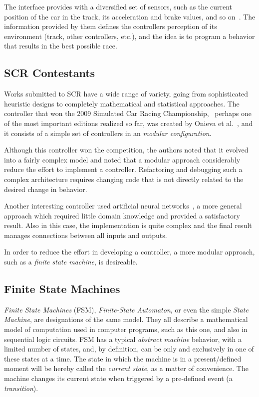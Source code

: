 The interface provides with a diversified set of sensors, such as the current 
position of the car in the track, its acceleration and brake values, and so on~\cite{scr2009}. 
The information provided by them defines the controllers perception of its environment (track, other controllers, etc.), and the idea is to program a behavior that results
in the best possible race. 

\subsection{SCR Contestants}
Works submitted to SCR have a wide range of variety, going from sophisticated 
heuristic designs to completely mathematical and statistical approaches. The 
controller that won the 2009 Simulated Car Racing Championship,~\cite{scr2009}
perhaps one of the most important editions realized so far, was created by 
Onieva et al.~\cite{onieva_2009}, and it 
consists of a simple set of controllers in an \emph{modular configuration}. 

Although this controller won the competition, the authors noted that it evolved 
into a fairly complex model and noted that a modular approach considerably reduce 
the effort to implement a  controller. Refactoring and debugging such a complex 
architecture requires changing code that is not directly related to the desired
change in behavior.

Another interesting controller used  artificial neural networks~\cite{cardamone_2010},
a more general approach which required little domain knowledge and provided a 
satisfactory result. Also in this case,  the implementation is quite complex and 
the final result manages connections between all inputs and outputs.

In order to reduce the effort in developing a controller, a more modular approach,
such as a \emph{finite state machine}, is desireable.

\subsection{Finite State Machines}\label{sec:fsm}

\emph{Finite State Machines} (FSM), \emph{Finite-State Automaton}, or even the 
simple \emph{State Machine}, are designations of the same model. They all 
describe a mathematical model of computation used in computer programs, such as 
this one, and also in sequential logic circuits. FSM has a typical \textit{abstract machine} behavior,
with a limited number of states, and, by definition, can be only and exclusively in one of these states at a time. The 
state in which the machine is in a present/defined moment will be hereby called the \emph{current state}, as a matter
of convenience. The machine changes its current state when triggered by a pre-defined event (a \emph{transition}).

